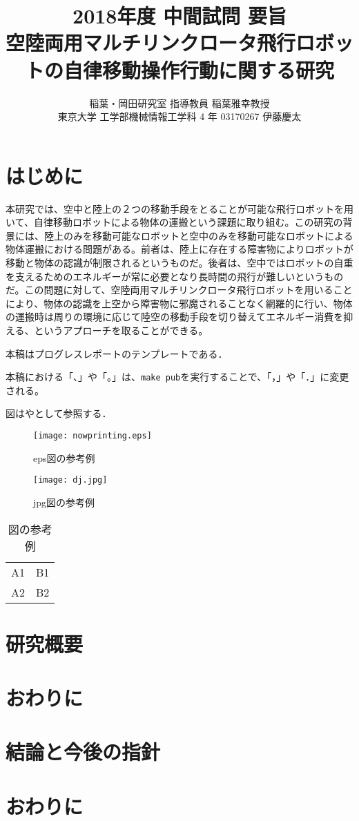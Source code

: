 \documentclass[twocolumn]{preport}
\title{2018年度 中間試問 要旨 \\
空陸両用マルチリンクロータ飛行ロボットの自律移動操作行動に関する研究}
\author{稲葉・岡田研究室 指導教員 稲葉雅幸教授 \\
東京大学 工学部機械情報工学科 4 年 03170267 伊藤慶太}
\begin{document}
\pagestyle{empty}
\maketitle
\thispagestyle{empty}
\sloppy

\section{はじめに}

本研究では、空中と陸上の２つの移動手段をとることが可能な飛行ロボットを用いて、自律移動ロボットによる物体の運搬という課題に取り組む。この研究の背景には、陸上のみを移動可能なロボットと空中のみを移動可能なロボットによる物体運搬における問題がある。前者は、陸上に存在する障害物によりロボットが移動と物体の認識が制限されるというものだ。後者は、空中ではロボットの自重を支えるためのエネルギーが常に必要となり長時間の飛行が難しいというものだ。この問題に対して、空陸両用マルチリンクロータ飛行ロボットを用いることにより、物体の認識を上空から障害物に邪魔されることなく網羅的に行い、物体の運搬時は周りの環境に応じて陸空の移動手段を切り替えてエネルギー消費を抑える、というアプローチを取ることができる。

本稿はプログレスレポートのテンプレートである\cite{Sakai}．

本稿における「、」や「。」は、\verb|make pub|を実行することで、「，」や「．」に変更される。

図はやとして参照する．

\begin{figure}[tbh]
 \begin{center}
  \begin{minipage}{0.3\columnwidth}
   \texttt{[image: nowprinting.eps]}
   \caption{eps図の参考例}
  \end{minipage}
  \hspace{0.15\columnwidth}
  \begin{minipage}{0.3\columnwidth}
   \texttt{[image: dj.jpg]}
   \caption{jpg図の参考例}
  \end{minipage}
  \label{figure:nowprinting}
 \end{center}
\end{figure}

\begin{table}[tbh]
 \begin{center}
  \begin{tabular}{|l|r|} \hline
  A1 & B1 \\
  A2 & B2 \\ \hline
  \end{tabular}
  \caption{図の参考例}
  \label{table:sample}
 \end{center}
\end{table}

\section{研究概要}
\section{おわりに}
\section{結論と今後の指針}
\section{おわりに}




\end{document}
